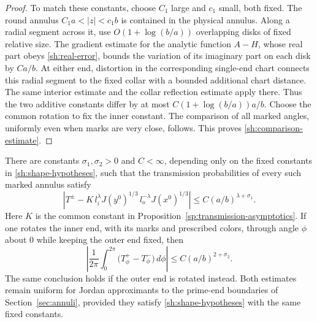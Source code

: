 \begin{proof}
To match these constants, choose $C_1$ large and $c_1$ small, both
fixed.  The round annulus $C_1a<|z|<c_1b$ is contained in the
physical annulus.  Along a radial segment across it, use
$O(1+\log(b/a))$ overlapping disks of fixed relative size.
The gradient estimate for the analytic function $A-H$, whose real
part obeys \eqref{sh:real-error}, bounds the variation of its
imaginary part on each disk by $Ca/b$.
At either end, distortion in the corresponding single-end chart
connects this radial segment to the fixed collar with a bounded
additional chart distance.  The same interior estimate and the
collar reflection estimate apply there.
Thus the two additive constants differ by at most
$C(1+\log(b/a))a/b$.  Choose the common rotation to fix the inner
constant.  The comparison of all marked angles, uniformly even
when marks are very close, follows.  This proves
\eqref{sh:comparison-estimate}.
\end{proof}

\begin{proposition}\label{sh:separated-ends}
There are constants $\sigma_1,\sigma_2>0$ and $C<\infty$,
depending only on the fixed constants in
\eqref{sh:shape-hypotheses}, such that the transmission probabilities
of every such marked annulus satisfy
\begin{equation}\label{sh:rank-one}
 \left|T^\pm-
 K\,l_i^\lambda J(y^0)^{1/3}\,
       l_o^{-\lambda}J(x^0)^{1/3}\right|
 \le C(a/b)^{\lambda+\sigma_1}.
\end{equation}
Here $K$ is the common constant in
Proposition~\ref{sp:transmission-asymptotics}.  If one rotates the
inner end, with its marks and prescribed colors, through angle $\phi$
about $0$ while keeping the outer end fixed, then
\begin{equation}\label{sh:rotation-average}
 \left|\frac1{2\pi}\int_0^{2\pi}
                 \bigl(T^+_\phi-T^-_\phi\bigr)\,d\phi\right|
       \le C(a/b)^{2+\sigma_2}.
\end{equation}
The same conclusion holds if the outer end is rotated instead.
Both estimates remain uniform for Jordan approximants to the
prime-end boundaries of Section~\ref{sec:annuli}, provided they
satisfy \eqref{sh:shape-hypotheses} with the same fixed constants.
\end{proposition}

